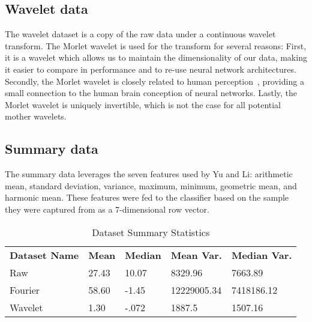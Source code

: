 \subsection{Wavelet data}
The wavelet dataset is a copy of the raw data under a continuous wavelet transform. 
The Morlet wavelet is used for the transform for several reasons:
First, it is a wavelet which allows us to maintain the dimensionality of our data, making it easier to compare in performance and to re-use neural network architectures.
Secondly, the Morlet wavelet is closely related to human perception~\cite{mallat1999wavelet, daugman1985uncertainty}, providing a small connection to the human brain conception of neural networks.
Lastly, the Morlet wavelet is uniquely invertible, which is not the case for all potential mother wavelets. 

\subsection{Summary data}
The summary data leverages the seven features used by Yu and Li: arithmetic mean, standard deviation, variance, maximum, minimum, geometric mean, and harmonic mean. 
These features were fed to the classifier based on the sample they were captured from as a 7-dimensional row vector.

\renewcommand{\thefootnote}{*} 
\begin{table}[h]
\centering
\begin{tabular}{l|llll}
\textbf{Dataset Name} & \textbf{Mean} & \textbf{Median} & \textbf{Mean Var.} & \textbf{Median Var.} \\\cline{1-5}
Raw         & 27.43    & 10.07    & 8329.96    & 7663.89 \\
Fourier       & 58.60\footnotemark    & -1.45    & 12229005.34    & 7418186.12 \\
Wavelet        & 1.30    & -.072    & 1887.5    & 1507.16 \\             
\end{tabular}
\caption{Dataset Summary Statistics}
\label{Tab:summary}
\end{table}

